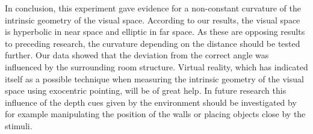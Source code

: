In conclusion, this experiment gave evidence for a non-constant curvature of the intrinsic geometry of the visual space. According to our results, the visual space is hyperbolic in near space and elliptic in far space. As these are opposing results to preceding research, the curvature depending on the distance should be tested further. Our data showed that the deviation from the correct angle was influenced by the surrounding room structure. Virtual reality, which has indicated itself as a possible technique when measuring the intrinsic geometry of the visual space using exocentric pointing, will be of great help. In future research this influence of the depth cues given by the environment should be investigated by for example manipulating the position of the walls or placing objects close by the stimuli.



